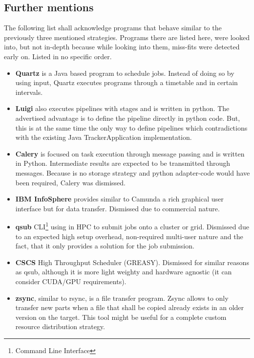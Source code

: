 \subsection{Further mentions}

The following list shall acknowledge programs that behave similar to the previously three mentioned strategies.
Programs there are listed here, were looked into, but not in-depth because while looking into them, miss-fits were detected early on. Listed in no specific order.

\begin{itemize}
	\item \textbf{Quartz}\cite{quartz:main} is a Java based program to schedule jobs. Instead of doing so by using input, Quartz executes programs through a timetable and in certain intervals.
	\item \textbf{Luigi}\cite{luigi:etc:distributed_pipelines} also executes pipelines with stages and is written in python. The advertised advantage is to define the pipeline directly in python code. But, this is at the same time the only way to define pipelines which contradictions with the existing Java TrackerApplication implementation.
	\item \textbf{Calery}\cite{celery:main} is focused on task execution through message passing and is written in Python. Intermediate results are expected to be transmitted through messages. Because is no storage strategy and python adapter-code would have been required, Calery was dismissed.
	\item \textbf{IBM InfoSphere}\cite{infosphere:datastage} provides similar to Camunda a rich graphical user interface but for data transfer. Dismissed due to commercial nature.
	\item \textbf{qsub}\cite{qsub:etc:wiki}\cite{qsub:etc:uiowa} CLI\footnote{Command Line Interface} using in HPC to submit jobs onto a cluster or grid. Dismissed due to an expected high setup overhead, non-required multi-user nature and the fact, that it only provides a solution for the job submission.
	\item \textbf{CSCS}\cite{cscs:high_throughput} High Throughput Scheduler (GREASY). Dismissed for similar reasons as qsub, although it is more light weighty and hardware agnostic (it can consider CUDA/GPU requirements).
	\item \textbf{zsync}\cite{zsync:main}, similar to rsync, is a file transfer program. Zsync allows to only transfer new parts when a file that shall be copied already exists in an older version on the target. This tool might be useful for a complete custom resource distribution strategy.

\end{itemize}
